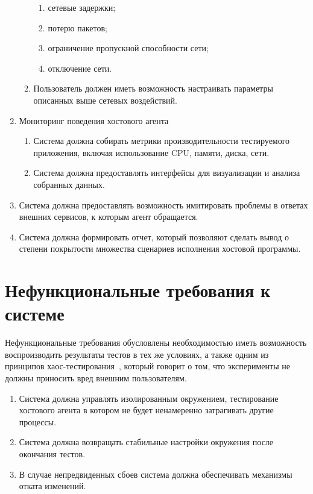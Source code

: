 \begin{enumerate}
\begin{enumerate}
    \begin{enumerate}
      \item сетевые задержки;
      \item потерю пакетов;
      \item ограничение пропускной способности сети;
      \item отключение сети.
    \end{enumerate}
    \item Пользователь должен иметь возможность настраивать параметры описанных выше сетевых воздействий.
  \end{enumerate}
  \item Мониторинг поведения хостового агента
  \begin{enumerate}
    \item Система должна собирать метрики производительности тестируемого приложения, включая использование CPU, памяти, диска, сети.
    \item Система должна предоставлять интерфейсы для визуализации и анализа собранных данных.
  \end{enumerate}
  \item Система должна предоставлять возможность имитировать проблемы в ответах внешних сервисов, к которым агент обращается.
  \item Система должна формировать отчет, который позволяют сделать вывод о степени покрытости множества сценариев исполнения хостовой программы.
\end{enumerate}

\section{Нефункциональные требования к системе}

Нефункциональные требования обусловлены необходимостью иметь возможность воспроизводить результаты тестов в тех же условиях,
а также одним из принципов хаос-тестирования~\cite{principles}, который говорит о том, что эксперименты не должны приносить вред внешним пользователям.

\begin{enumerate}
  \item Система должна управлять изолированным окружением, тестирование хостового агента в котором не будет
  ненамеренно затрагивать другие процессы.
  \item Система должна возвращать стабильные настройки окружения после окончания тестов.
  \item В случае непредвиденных сбоев система должна обеспечивать механизмы отката изменений.
\end{enumerate}